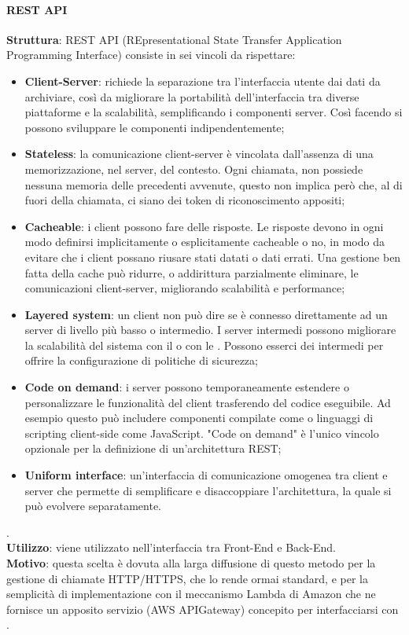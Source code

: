 \documentclass[../DefinizioneDiProdotto_v3.0.0.tex]{subfiles}
\begin{document}
\paragraph{REST API}\mbox{}
\begin{addmargin}[1em]{2em}%
	\textbf{Struttura}: REST API (REpresentational State Transfer Application Programming Interface) consiste in sei vincoli da rispettare:
	\begin{itemize}
		\item \textbf{Client-Server}: richiede la separazione tra l'interfaccia utente dai dati da archiviare, così da migliorare la portabilità dell'interfaccia tra diverse piattaforme e la scalabilità, semplificando i componenti server. Così facendo si possono sviluppare le componenti indipendentemente;
		\item \textbf{Stateless}: la comunicazione client-server è vincolata dall'assenza di una memorizzazione, nel server, del contesto. Ogni chiamata, non possiede nessuna memoria delle precedenti avvenute, questo non implica però che, al di fuori della chiamata, ci siano dei token di riconoscimento appositi;
		\item \textbf{Cacheable}:  i client possono fare  delle risposte. Le risposte devono in ogni modo definirsi implicitamente o esplicitamente cacheable o no, in modo da evitare che i client possano riusare stati datati o dati errati. Una gestione ben fatta della cache può ridurre, o addirittura parzialmente eliminare, le comunicazioni client-server, migliorando scalabilità e performance;
		\item \textbf{Layered system}: un client non può dire se è connesso direttamente ad un server di livello più basso o intermedio. I server intermedi possono migliorare la scalabilità del sistema con il  o con le . Possono esserci dei  intermedi per offrire la configurazione di politiche di sicurezza;
		\item \textbf{Code on demand}:  i server possono temporaneamente estendere o personalizzare le funzionalità del client trasferendo del codice eseguibile. Ad esempio questo può includere componenti compilate come  o linguaggi di scripting client-side come JavaScript. "Code on demand" è l'unico vincolo opzionale per la definizione di un'architettura REST;
		\item \textbf{Uniform interface}: un'interfaccia di comunicazione omogenea tra client e server che permette di semplificare e disaccoppiare l'architettura, la quale si può evolvere separatamente.
	\end{itemize}.\\
	\textbf{Utilizzo}: viene utilizzato nell'interfaccia tra Front-End e Back-End.\\
	\textbf{Motivo}: questa scelta è dovuta alla larga diffusione di questo metodo per la gestione di chiamate HTTP/HTTPS, che lo rende ormai standard, e per la semplicità di implementazione con il meccanismo Lambda di Amazon che ne fornisce un apposito servizio (AWS APIGateway) concepito per interfacciarsi con .

\end{addmargin}
\end{document}
